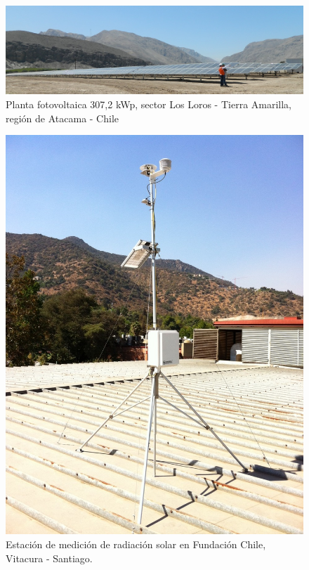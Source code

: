 \begin{figure}[h!]
        \centering
        \includegraphics[scale=1.5]{images/plantaSubSoleLorosAmarilla}
        \caption{Planta fotovoltaica 307,2 kWp, sector Los Loros - Tierra Amarilla, región de Atacama - Chile}
\end{figure}
\begin{figure}[h!]
        \centering
        \includegraphics[scale=0.1]{images/estacionMedicionFch}
        \caption{Estación de medición de radiación solar en Fundación Chile, Vitacura - Santiago.}
\end{figure}

